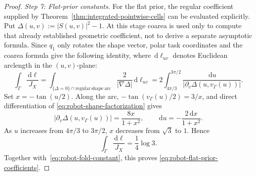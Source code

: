 \documentclass[10pt,a4paper]{amsart}
\newcommand{\dd}{\,\mathrm{d}}
\begin{document}
\begin{proof}
\smallskip
\noindent\emph{Step 7: Flat-prior constants.}
For the flat prior, the regular coefficient supplied by
Theorem~\ref{thm:integrated-pointwise-cells} can be evaluated explicitly.
Put $\Delta(u,v):=|S(u,v)|^2-1$.  At this stage coarea is used
only to compute that already established geometric coefficient, not to derive
a separate asymptotic formula.  Since $q_1$ only rotates the shape vector,
polar task coordinates and the coarea formula give the following identity,
where $\dd\ell_{uv}$ denotes Euclidean arclength in the $(u,v)$-plane:
\begin{equation}\label{eq:robot-flat-regular-reduction}
 \int_\Gamma\frac{\dd\ell}{J_X}
 =\int_{\{\Delta=0\}\cap\mathrm{regular\ shape\ arc}}
 \frac{2}{|\nabla\Delta|}\dd\ell_{uv}
 =2\int_{4\pi/3}^{3\pi/2}
 \frac{\dd u}{|\partial_v\Delta(u,v_\Gamma(u))|}.
\end{equation}
Set $x=-\tan(u/2)$.  Along the arc,
$-\tan(v_\Gamma(u)/2)=3/x$, and direct differentiation of
\eqref{eq:robot-shape-factorization} gives
\[
 |\partial_v\Delta(u,v_\Gamma(u))|=\frac{8x}{1+x^2},
 \qquad
 \dd u=-\frac{2\dd x}{1+x^2}.
\]
As $u$ increases from $4\pi/3$ to $3\pi/2$, $x$ decreases from $\sqrt3$ to
$1$.  Hence
\[
 \int_\Gamma\frac{\dd\ell}{J_X}
 =\frac14\log3.
\]
Together with~\eqref{eq:robot-fold-constant}, this proves
\eqref{eq:robot-flat-prior-coefficients}.
\end{proof}
\end{document}
